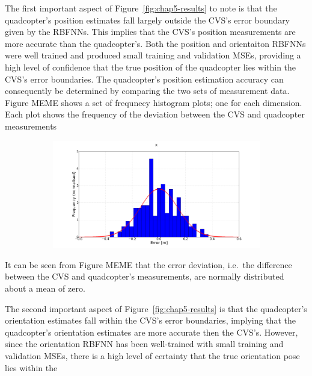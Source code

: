 The first important aspect of Figure~\ref{fig:chap5-results} to note is that the quadcopter's position estimates fall largely outside the CVS's error boundary given by the RBFNNs. This implies that the CVS's position measurements are more accurate than the quadcopter's. Both the position and orientaiton RBFNNs were well trained and produced small training and validation MSEs, providing a high level of confidence that the true position of the quadcopter lies within the CVS's error boundaries. The quadcopter's position estimation accuracy can consequently be determined by comparing the two sets of measurement data. Figure MEME shows a set of frequnecy histogram plots; one for each dimension. Each plot shows the frequency of the deviation between the CVS and quadcopter measurements

\begin{figure}
  \centering
  \begin{subfigure}{0.48\textwidth}
    \includegraphics[width=\textwidth]{figures/chapter5/err_x}
  \end{subfigure}
\end{figure}

It can be seen from Figure MEME that the error deviation, i.e.\ the difference between the CVS and quadcopter's measurements, are normally distributed about a mean of zero. 

The second important aspect of Figure~\ref{fig:chap5-results} is that the quadcopter's orientation estimates fall within the CVS's error boundaries, implying that the quadcopter's orientation estimates are more accurate then the CVS's. However, since the orientation RBFNN has been well-trained with small training and validation MSEs, there is a high level of certainty that the true orientation pose lies within the 



